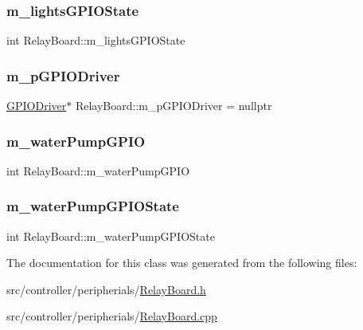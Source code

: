 \subsubsection{\texorpdfstring{m\+\_\+lights\+G\+P\+I\+O\+State}{m\_lightsGPIOState}}
{\footnotesize\ttfamily int Relay\+Board\+::m\+\_\+lights\+G\+P\+I\+O\+State}

\mbox{\label{classRelayBoard_ab567d2b303df89856d0e1e599aa538bc}} 
\subsubsection{\texorpdfstring{m\+\_\+p\+G\+P\+I\+O\+Driver}{m\_pGPIODriver}}
{\footnotesize\ttfamily \hyperlink{classGPIODriver}{G\+P\+I\+O\+Driver}$\ast$ Relay\+Board\+::m\+\_\+p\+G\+P\+I\+O\+Driver = nullptr\hspace{0.3cm}{\ttfamily [private]}}

\mbox{\label{classRelayBoard_a45807effbe5aaf2798d4f91dcf3c42d8}} 
\subsubsection{\texorpdfstring{m\+\_\+water\+Pump\+G\+P\+IO}{m\_waterPumpGPIO}}
{\footnotesize\ttfamily int Relay\+Board\+::m\+\_\+water\+Pump\+G\+P\+IO\hspace{0.3cm}{\ttfamily [private]}}

\mbox{\label{classRelayBoard_acf0292f25a47eb8facbec7279c0fa69d}} 
\subsubsection{\texorpdfstring{m\+\_\+water\+Pump\+G\+P\+I\+O\+State}{m\_waterPumpGPIOState}}
{\footnotesize\ttfamily int Relay\+Board\+::m\+\_\+water\+Pump\+G\+P\+I\+O\+State}



The documentation for this class was generated from the following files\+:\begin{DoxyCompactItemize}
\item 
src/controller/peripherials/\hyperlink{RelayBoard_8h}{Relay\+Board.\+h}\item 
src/controller/peripherials/\hyperlink{RelayBoard_8cpp}{Relay\+Board.\+cpp}\end{DoxyCompactItemize}
